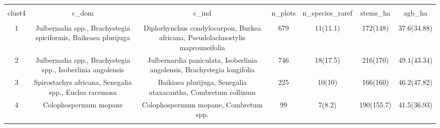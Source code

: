 
\begin{table}[!htbp] \centering 
  \caption{} 
  \label{clust_summ} 
\begin{tabular}{@{\extracolsep{5pt}} ccccccc} 
\\[-1.8ex]\hline 
\hline \\[-1.8ex] 
clust4 & c\_dom & c\_ind & n\_plots & n\_species\_raref & stems\_ha & agb\_ha \\ 
\hline \\[-1.8ex] 
1 & Julbernadia spp., Brachystegia spiciformis, Baikeaea plurijuga & Diplorhynchus condylocarpon, Burkea africana, Pseudolachnostylis maprouneifolia & 679 & 11(11.1) & 172(148) & 37.6(34.88) \\ 
2 & Julbernadia spp., Brachystegia spp., Isoberlinia angolensis & Julbernardia paniculata, Isoberlinia angolensis, Brachystegia longifolia & 746 & 18(17.5) & 216(170) & 49.1(43.34) \\ 
3 & Spirostachys africana, Senegalia spp., Euclea racemosa & Baikiaea plurijuga, Senegalia ataxacantha, Combretum collinum & 225 & 10(10) & 166(160) & 46.2(47.82) \\ 
4 & Colophospermum mopane & Colophospermum mopane, Combretum spp. & 99 & 7(8.2) & 190(155.7) & 41.5(36.93) \\ 
\hline \\[-1.8ex] 
\end{tabular} 
\end{table} 
